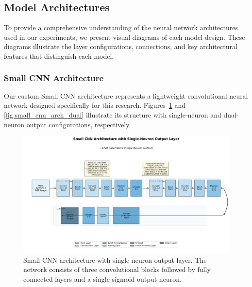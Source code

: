 \subsection{Model Architectures}

To provide a comprehensive understanding of the neural network architectures used in our experiments, we present visual diagrams of each model design. These diagrams illustrate the layer configurations, connections, and key architectural features that distinguish each model.

\subsubsection{Small CNN Architecture}

Our custom Small CNN architecture represents a lightweight convolutional neural network designed specifically for this research. Figures~\ref{fig:small_cnn_arch_single} and \ref{fig:small_cnn_arch_dual} illustrate its structure with single-neuron and dual-neuron output configurations, respectively.

\begin{figure}[htbp]
\centering
\includegraphics[width=\textwidth]{figures/small_cnn_1neuron_architecture.png}
\caption{Small CNN architecture with single-neuron output layer. The network consists of three convolutional blocks followed by fully connected layers and a single sigmoid output neuron.}
\label{fig:small_cnn_arch_single}
\end{figure}

